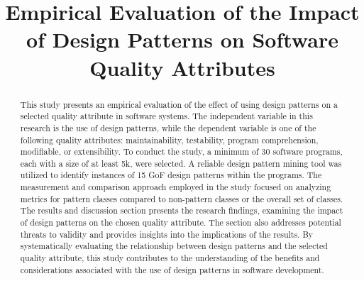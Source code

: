 \documentclass[conference]{IEEEtran}
\begin{document}
	
	\title{Empirical Evaluation of the Impact of Design Patterns on Software Quality Attributes}
	\author{
		\and
		\and
		}
	
	\maketitle
	
	\begin{abstract}
		This study presents an empirical evaluation of the effect of using design patterns on a selected quality attribute in software systems. The independent variable in this research is the use of design patterns, while the dependent variable is one of the following quality attributes: maintainability, testability, program comprehension, modifiable, or extensibility. To conduct the study, a minimum of 30 software programs, each with a size of at least 5k, were selected. A reliable design pattern mining tool was utilized to identify instances of 15 GoF design patterns within the programs. The measurement and comparison approach employed in the study focused on analyzing metrics for pattern classes compared to non-pattern classes or the overall set of classes. The results and discussion section presents the research findings, examining the impact of design patterns on the chosen quality attribute. The section also addresses potential threats to validity and provides insights into the implications of the results. By systematically evaluating the relationship between design patterns and the selected quality attribute, this study contributes to the understanding of the benefits and considerations associated with the use of design patterns in software development.
	\end{abstract}
	
\end{document}
